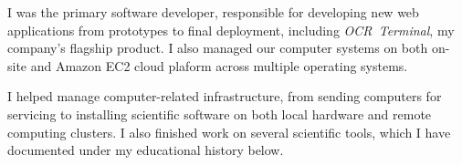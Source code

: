 
I was the primary software developer, responsible for developing new web applications from prototypes to final deployment, including {\it OCR~Terminal}, my company's flagship product. I also managed our computer systems on both on-site and Amazon EC2 cloud plaform across multiple operating systems.


I helped manage computer-related infrastructure, from sending computers for servicing to installing scientific software on both local hardware and remote computing clusters. I also finished work on several scientific tools, which I have documented under my educational history below.